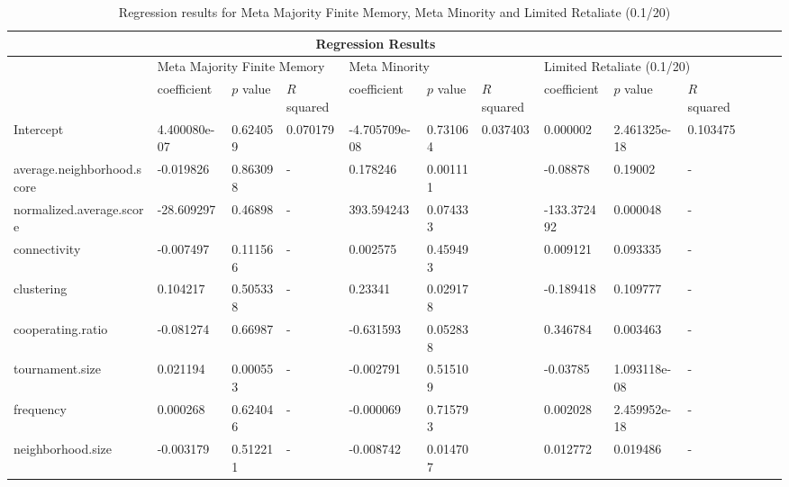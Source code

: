 \begin{table}[!hbtp]
	\centering
	\begin{adjustbox}{width=1\textwidth, height=0.2\textwidth}
		\small
		\begin{tabular}{|l|l|l|l|l|l|l|l|l|l|l|l|l|}
			\toprule
			\multicolumn{10}{|c|}{\textbf{Regression Results}}                                                                       \\ \hline
			& \multicolumn{3}{l|}{Meta Majority Finite Memory} & \multicolumn{3}{l|}{Meta Minority} & \multicolumn{3}{l|}{Limited Retaliate (0.1/20)}\\ \hline
			                           & coefficient  & \(p\) value & \(R\) squared & coefficient   & \(p\) value & \(R\) squared & coefficient & \(p\) value  & \(R\) squared \\ \hline
			Intercept                  & 4.400080e-07 & 0.624059    & 0.070179      & -4.705709e-08 & 0.731064    & 0.037403      & 0.000002    & 2.461325e-18 & 0.103475      \\ \hline
			average.neighborhood.score & -0.019826    & 0.863098    & -             & 0.178246      & 0.001111    &               & -0.08878    & 0.19002      & -             \\ \hline
			normalized.average.score   & -28.609297   & 0.46898     & -             & 393.594243    & 0.074333    &               & -133.372492 & 0.000048     & -             \\ \hline
			connectivity               & -0.007497    & 0.111566    & -             & 0.002575      & 0.459493    &               & 0.009121    & 0.093335     & -             \\ \hline
			clustering                 & 0.104217     & 0.505338    & -             & 0.23341       & 0.029178    &               & -0.189418   & 0.109777     & -             \\ \hline
			cooperating.ratio          & -0.081274    & 0.66987     & -             & -0.631593     & 0.052838    &               & 0.346784    & 0.003463     & -             \\ \hline
			tournament.size            & 0.021194     & 0.000553    & -             & -0.002791     & 0.515109    &               & -0.03785    & 1.093118e-08 & -             \\ \hline
			frequency                  & 0.000268     & 0.624046    & -             & -0.000069     & 0.715793    &               & 0.002028    & 2.459952e-18 & -             \\ \hline
			neighborhood.size          & -0.003179    & 0.512211    & -             & -0.008742     & 0.014707    &               & 0.012772    & 0.019486     & -             \\ \bottomrule
		\end{tabular}
	\end{adjustbox}
	\caption{Regression results for ​Meta Majority Finite Memory, Meta Minority and Limited Retaliate (0.1/20)}
	\label{reg-for-bot}
\end{table}

